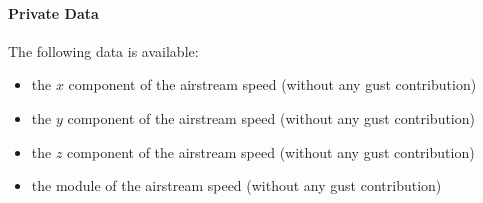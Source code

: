 \paragraph{Private Data}
The following data is available:
\begin{itemize}
\item {} the $x$ component of the airstream speed (without any gust contribution)
\item {} the $y$ component of the airstream speed (without any gust contribution)
\item {} the $z$ component of the airstream speed (without any gust contribution)
\item {} the module of the airstream speed (without any gust contribution)
\end{itemize}



